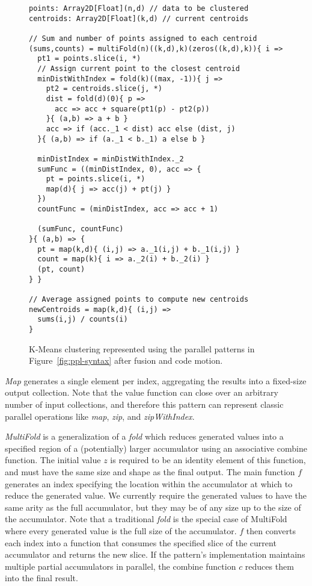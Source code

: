 \begin{figure}\centering
\begin{lstlisting}
points: Array2D[Float](n,d) // data to be clustered
centroids: Array2D[Float](k,d) // current centroids

// Sum and number of points assigned to each centroid
(sums,counts) = multiFold(n)((k,d),k)(zeros((k,d),k)){ i =>
  pt1 = points.slice(i, *)
  // Assign current point to the closest centroid
  minDistWithIndex = fold(k)((max, -1)){ j =>
    pt2 = centroids.slice(j, *)
    dist = fold(d)(0){ p =>
      acc => acc + square(pt1(p) - pt2(p))
    }{ (a,b) => a + b }
    acc => if (acc._1 < dist) acc else (dist, j)
  }{ (a,b) => if (a._1 < b._1) a else b }

  minDistIndex = minDistWithIndex._2
  sumFunc = ((minDistIndex, 0), acc => {
    pt = points.slice(i, *)
    map(d){ j => acc(j) + pt(j) }
  })
  countFunc = (minDistIndex, acc => acc + 1)

  (sumFunc, countFunc)
}{ (a,b) => {
  pt = map(k,d){ (i,j) => a._1(i,j) + b._1(i,j) }
  count = map(k){ i => a._2(i) + b._2(i) }
  (pt, count)
} }

// Average assigned points to compute new centroids
newCentroids = map(k,d){ (i,j) =>
  sums(i,j) / counts(i)
}
\end{lstlisting}
\caption{K-Means clustering represented using the parallel patterns in Figure~\ref{fig:ppl-syntax} after fusion and code motion.}
\label{fig:kmeans-fused}
\end{figure}


\emph{Map} generates a single element per index, aggregating the results into a fixed-size output collection.
Note that the value function can close over an arbitrary number of input collections, and therefore this pattern can represent classic parallel operations like \emph{map}, \emph{zip},
and \emph{zipWithIndex}.

\emph{MultiFold} is a generalization of a \emph{fold} which reduces generated values into a specified region of a (potentially) larger accumulator using an associative combine function.
The initial value $z$ is required to be an identity element of this function, and must have the same size and shape as the final output.
The main function $f$ generates an index specifying the location within the accumulator at which to reduce the generated value. We currently require the generated values to have the same arity as the full accumulator, but they may be of any size up to the size of the accumulator. Note that a traditional \emph{fold} is the special case of MultiFold where every generated value is the full size of the accumulator.
$f$ then converts each index into a function that consumes the specified slice of the current accumulator and returns the new slice. If the pattern's implementation maintains multiple partial accumulators in parallel, the combine function $c$ reduces them into the final result.

